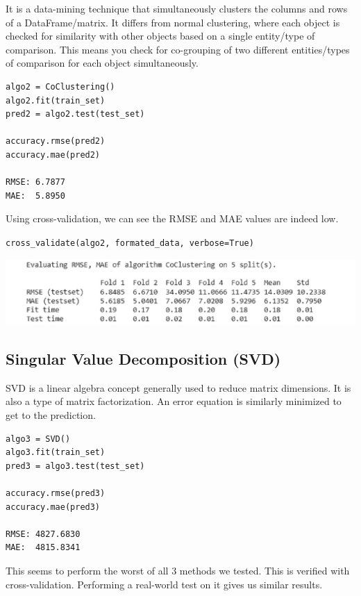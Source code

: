\documentclass{article}
\begin{document}
It is a data-mining technique that simultaneously clusters the columns and rows of a DataFrame/matrix. It differs from normal clustering, where each object is checked for similarity with other objects based on a single entity/type of comparison. This means you check for co-grouping of two different entities/types of comparison for each object simultaneously.

\begin{lstlisting}
algo2 = CoClustering()
algo2.fit(train_set)
pred2 = algo2.test(test_set)

accuracy.rmse(pred2)
accuracy.mae(pred2)

RMSE: 6.7877
MAE:  5.8950
\end{lstlisting}

Using cross-validation, we can see the RMSE and MAE values are indeed low.

\begin{center}
    \texttt{cross\_validate(algo2, formated\_data, verbose=True)}
\end{center}

\begin{center}
\includegraphics[scale=0.37]{05.png}
\end{center}

\subsection{Singular Value Decomposition (SVD)}

SVD is a linear algebra concept generally used to reduce matrix dimensions. It is also a type of matrix factorization. An error equation is similarly minimized to get to the prediction.

\begin{lstlisting}
algo3 = SVD()
algo3.fit(train_set)
pred3 = algo3.test(test_set)

accuracy.rmse(pred3)
accuracy.mae(pred3)

RMSE: 4827.6830
MAE:  4815.8341
\end{lstlisting}

This seems to perform the worst of all 3 methods we tested. This is verified with cross-validation. Performing a real-world test on it gives us similar results.
\end{document}
